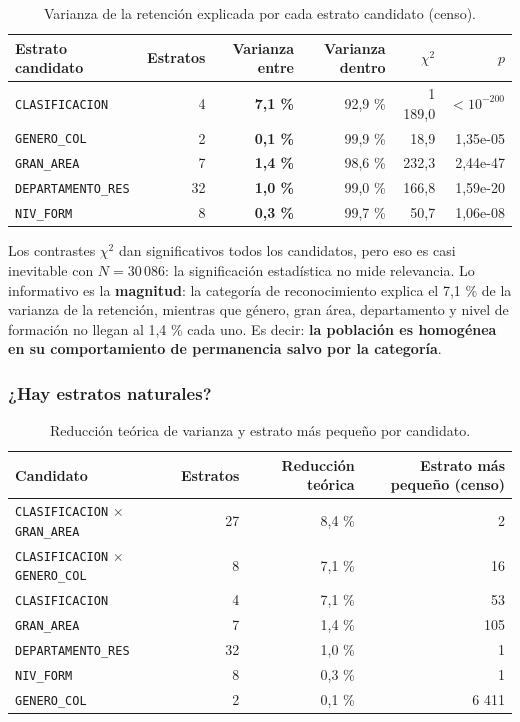 \begin{table}[H]
  \centering
  \small
  \caption{Varianza de la retención explicada por cada estrato candidato (censo).}
  \label{tab:mues-bivariado}
  \begin{tabular}{@{}lrrrrr@{}}
    \toprule
    \textbf{Estrato candidato} & \textbf{Estratos} & \textbf{Varianza entre}
      & \textbf{Varianza dentro} & $\chi^2$ & $p$ \\
    \midrule
    \texttt{CLASIFICACION} & 4 & \textbf{7,1 \%} & 92,9 \% & 1 189,0 & $<10^{-200}$ \\
    \texttt{GENERO\_COL} & 2 & \textbf{0,1 \%} & 99,9 \% & 18,9 & 1,35e-05 \\
    \texttt{GRAN\_AREA} & 7 & \textbf{1,4 \%} & 98,6 \% & 232,3 & 2,44e-47 \\
    \texttt{DEPARTAMENTO\_RES} & 32 & \textbf{1,0 \%} & 99,0 \% & 166,8 & 1,59e-20 \\
    \texttt{NIV\_FORM} & 8 & \textbf{0,3 \%} & 99,7 \% & 50,7 & 1,06e-08 \\
    \bottomrule
  \end{tabular}
\end{table}

Los contrastes $\chi^2$ dan significativos todos los candidatos, pero eso es
casi inevitable con $N = 30\,086$: la significación estadística no mide
relevancia. Lo informativo es la \textbf{magnitud}: la categoría de
reconocimiento explica el 7,1 \% de la varianza de la retención, mientras que
género, gran área, departamento y nivel de formación no llegan al 1,4 \% cada
uno. Es decir: \textbf{la población es homogénea en su comportamiento de
permanencia salvo por la categoría}.

\subsubsection{¿Hay estratos naturales?}

\begin{table}[H]
  \centering
  \small
  \caption{Reducción teórica de varianza y estrato más pequeño por candidato.}
  \label{tab:mues-estratos}
  \begin{tabular}{@{}lrrr@{}}
    \toprule
    \textbf{Candidato} & \textbf{Estratos} & \textbf{Reducción teórica}
      & \textbf{Estrato más pequeño (censo)} \\
    \midrule
    \texttt{CLASIFICACION} $\times$ \texttt{GRAN\_AREA} & 27 & 8,4 \% & 2 \\
    \texttt{CLASIFICACION} $\times$ \texttt{GENERO\_COL} & 8 & 7,1 \% & 16 \\
    \texttt{CLASIFICACION} & 4 & 7,1 \% & 53 \\
    \texttt{GRAN\_AREA} & 7 & 1,4 \% & 105 \\
    \texttt{DEPARTAMENTO\_RES} & 32 & 1,0 \% & 1 \\
    \texttt{NIV\_FORM} & 8 & 0,3 \% & 1 \\
    \texttt{GENERO\_COL} & 2 & 0,1 \% & 6 411 \\
    \bottomrule
  \end{tabular}
\end{table}

